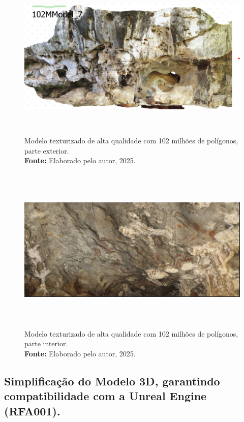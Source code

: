 \begin{enumerate}
\begin{figure}[H]
        \centering
        \includegraphics[height=8cm, keepaspectratio]{img/reality e fotogrametria processo/102M textura.png}
        \caption{Modelo texturizado de alta qualidade com 102 milhões de polígonos, parte exterior. \\
            \textbf{Fonte:} Elaborado pelo autor, 2025.}
        \label{fig:texturizado}
\end{figure}
\begin{figure}[H]
        \centering
        \includegraphics[height=8cm, keepaspectratio]{img/reality e fotogrametria processo/interior.png}
        \caption{Modelo texturizado de alta qualidade com 102 milhões de polígonos, parte interior. \\
            \textbf{Fonte:} Elaborado pelo autor, 2025.}
        \label{fig:interior}
\end{figure}
\end{enumerate}
    \subsection{Simplificação do Modelo 3D, garantindo compatibilidade com a Unreal Engine (RFA001).}
  
